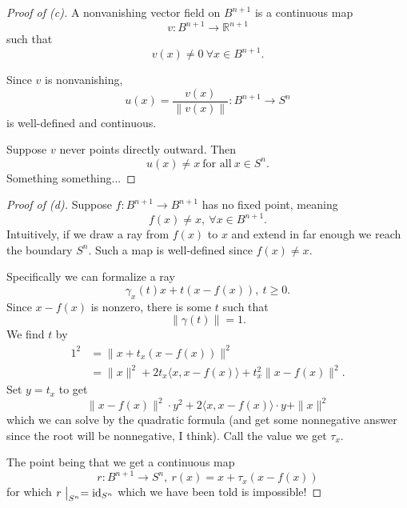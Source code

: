 \documentclass[11pt]{article}
\begin{document}
\begin{proof}[Proof of (c)]
    A nonvanishing vector field on 
    $B^{n+1}$ is a continuous map 
    \[
        v : B^{n+1} \to \mathbb R^{n+1}
    \]
    such that 
    \[
        v(x) \neq 0 \ \forall x \in B^{n+1}. 
    \]
   
    Since $v$ is nonvanishing, 
    \[
        u(x) = \frac{v(x)}{\|v(x)\|} : 
        B^{n+1} \to S^n 
    \]
    is well-defined and continuous. 

    Suppose $v$ never points directly outward. 
    Then 
    \[
        u(x) \neq x \ \text{for all} \ x\in S^n. 
    \]
    Something something... 
\end{proof}
\begin{proof}[Proof of (d)]
    Suppose $f : B^{n+1} \to B^{n+1}$ has no fixed point, 
    meaning 
    \[
        f(x) \neq x, \ \forall x \in B^{n+1}. 
    \]
    Intuitively, if we draw a ray from $f(x)$ to $x$ 
    and extend in far enough we reach the boundary 
    $S^n$. Such a map is well-defined since 
    $f(x) \neq x$. 

    Specifically we can formalize a ray
    \[
        \gamma_x(t) x + t(x - f(x)), \ t \geq 0. 
    \]
    Since $x - f(x)$ is nonzero, 
    there is some $t$ such that 
    \[
        \|\gamma(t)\| = 1. 
    \]
    We find $t$ by 
    \begin{align*}
        1^2 &= \|x + t_x(x-f(x))\|^2 \\ 
        &= \|x\|^2 + 2t_x\langle x, x - f(x)\rangle 
        + t^2_x \|x - f(x)\|^2. 
    \end{align*}
    Set $y = t_x$ to get 
    \[
        \|x-f(x)\|^2 \cdot y^2 + 
        2\langle x, x-f(x) \rangle \cdot y 
        + \|x\|^2
    \]
    which we can solve by the quadratic formula (and 
    get some nonnegative answer since the 
    root will be nonnegative, I think). 
    Call the value we get $\tau_x$. 

    The point being that we get a continuous map 
    \[
        r : B^{n+1} \to S^n, \ r(x) 
        = x + \tau_x(x - f(x))
    \]
    for which $r\bigm|_{S^n} = \operatorname{id}_{S^n}$ 
    which we have been told is impossible!   
    
\end{proof}
\end{document}

